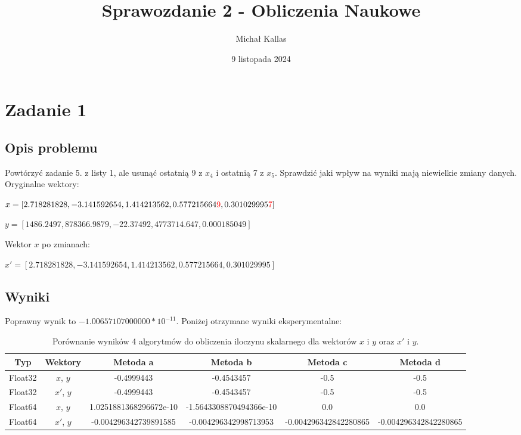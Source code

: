 \documentclass{article}
\title{Sprawozdanie 2 - Obliczenia Naukowe}
\author{Michał Kallas}
\date{9 listopada 2024}
\begin{document}
\maketitle

\section{Zadanie 1}
\subsection{Opis problemu}
Powtórzyć zadanie 5. z listy 1, ale usunąć ostatnią 9 z $x_4$ i ostatnią 7 z $x_5$. Sprawdzić jaki wpływ na wyniki mają
niewielkie zmiany danych.\\

\noindent Oryginalne wektory:

\begin{description}
    \item $x = [2.718281828, -3.141592654, 1.414213562, 0.577215664\textcolor{red}{9}, 0.301029995\textcolor{red}{7}]$
    \item $y = [1486.2497, 878366.9879, -22.37492, 4773714.647, 0.000185049]$
\end{description}

\noindent Wektor $x$ po zmianach:

\begin{description}
    \item $x' = [2.718281828, -3.141592654, 1.414213562, 0.577215664, 0.301029995]$
\end{description}

\subsection{Wyniki}
Poprawny wynik to $-1.00657107000000 * 10^{-11}$. Poniżej otrzymane wyniki eksperymentalne:

\begin{table}[H]
\begin{adjustbox}{center}
\begin{tabular}{|c|c|c|c|c|c|}
    \hline
    Typ & Wektory & Metoda a & Metoda b & Metoda c & Metoda d\\
    \hline
    Float32 & $x$, $y$ & -0.4999443 & -0.4543457 & -0.5 & -0.5\\
    \hline
    Float32 & $x'$, $y$ & -0.4999443 & -0.4543457 & -0.5 & -0.5\\
    \hline
    Float64 & $x$, $y$ & 1.0251881368296672e-10 & -1.5643308870494366e-10 & 0.0 & 0.0\\
    \hline
    Float64 & $x'$, $y$ & -0.004296342739891585 & -0.004296342998713953 & -0.004296342842280865 & -0.004296342842280865\\
    \hline
\end{tabular}
\end{adjustbox}
\caption{Porównanie wyników 4 algorytmów do obliczenia iloczynu skalarnego dla wektorów $x$ i $y$ oraz $x'$ i $y$.}
\end{table}
\end{document}
